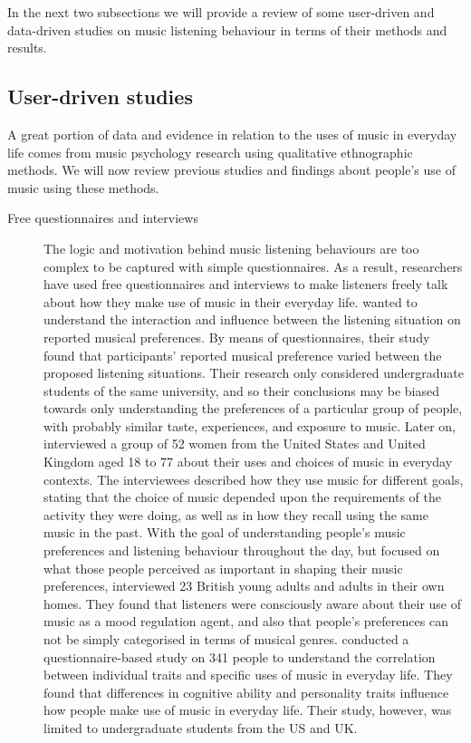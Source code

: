In the next two subsections we will provide a review of some user-driven and data-driven studies on music listening behaviour in terms of their methods and results.

\subsection{User-driven studies}
A great portion of data and evidence in relation to the uses of music in everyday life comes from music psychology research using qualitative ethnographic methods. We will now review previous studies and findings about people's use of music using these methods.

\begin{description}
	\item[Free questionnaires and interviews] The logic and motivation behind music listening be\-haviours are too complex to be captured with simple questionnaires. As a result, researchers have used free questionnaires and interviews to make listeners freely talk about how they make use of music in their everyday life. 
	\textcite{north96situational} wanted to understand the interaction and influence between the listening situation on reported musical preferences. By means of questionnaires, their study found that participants' reported musical preference varied between the proposed listening situations. Their research only considered undergraduate students of the same university, and so their conclusions may be biased towards only understanding the preferences of a particular group of people, with probably similar  taste, experiences, and exposure to music. 
	Later on, \textcite{denora00music} interviewed a group of 52 women from the United States and United Kingdom aged 18 to 77 about their uses and choices of music in everyday contexts.
	The interviewees described how they use music for different goals, stating that the choice of music depended upon the requirements of the activity they were doing, as well as in how they recall using the same music in the past.
	With the goal of understanding people's music preferences and listening behaviour throughout the day, but focused on what those people perceived as important in shaping their music preferences, \textcite{greasley06music} interviewed 23 British young adults and adults in their own homes.
	They found that listeners were consciously aware about their use of music as a mood regulation agent, and also that people's preferences can not be simply categorised in terms of musical genres. 
	\textcite{chamorro-premuzic07personality} conducted a questionnaire-based study on 341 people to understand the correlation between individual traits and specific uses of music in everyday life. They found that differences in cognitive ability and personality traits influence how people make use of music in everyday life. Their study, however, was limited to undergraduate students from the US and UK.


\end{description}
